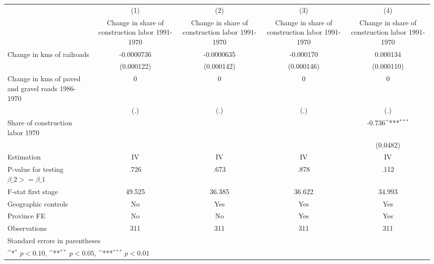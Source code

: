 {
\def\sym#1{\ifmmode^{#1}\else\(^{#1}\)\fi}
\begin{tabular}{l*{4}{c}}
\hline\hline
                &\multicolumn{1}{c}{(1)}&\multicolumn{1}{c}{(2)}&\multicolumn{1}{c}{(3)}&\multicolumn{1}{c}{(4)}\\
                &\multicolumn{1}{c}{Change in share of construction labor 1991-1970}&\multicolumn{1}{c}{Change in share of construction labor 1991-1970}&\multicolumn{1}{c}{Change in share of construction labor 1991-1970}&\multicolumn{1}{c}{Change in share of construction labor 1991-1970}\\
\hline
Change in kms of railroads&-0.0000736         &-0.0000635         &-0.000170         & 0.000134         \\
                &(0.000122)         &(0.000142)         &(0.000146)         &(0.000110)         \\
[1em]
Change in kms of paved and gravel roads 1986-1970&        0         &        0         &        0         &        0         \\
                &      (.)         &      (.)         &      (.)         &      (.)         \\
[1em]
Share of construction labor 1970&                  &                  &                  &   -0.736\sym{***}\\
                &                  &                  &                  & (0.0482)         \\
\hline
Estimation      &       IV         &       IV         &       IV         &       IV         \\
P-value for testing $\beta\_2 >= \beta\_1$&     .726         &     .673         &     .878         &     .112         \\
F-stat first stage&   49.525         &   36.385         &   36.622         &   34.993         \\
Geographic controls&       No         &      Yes         &      Yes         &      Yes         \\
Province FE     &       No         &       No         &      Yes         &      Yes         \\
Observations    &      311         &      311         &      311         &      311         \\
\hline\hline
\multicolumn{5}{l}{\footnotesize Standard errors in parentheses}\\
\multicolumn{5}{l}{\footnotesize \sym{*} \(p<0.10\), \sym{**} \(p<0.05\), \sym{***} \(p<0.01\)}\\
\end{tabular}
}

